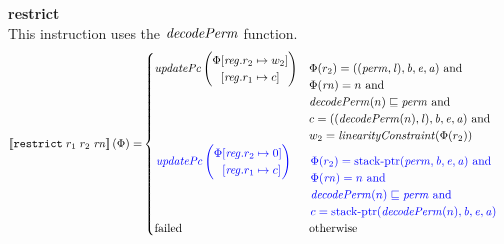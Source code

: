 \documentclass[a4paper]{article}
\begin{document}
\noindent\textbf{restrict}\\
This instruction uses the $\decPerm{}$ function.
\begin{align*}
  \sem{\trestrict{r_1}{r_2}{\rn}}(\Phi) = &
                                      \begin{cases}
                                        \updPcAddr{}\left(
                                          \arraycolsep=0pt
                                          \begin{array}{rl}
                                          \Phi&\updReg{r_2}{w_2}\\
                                              &\updReg{r_1}{c}
                                          \end{array} \right)
&
                                        \arraycolsep=0pt
                                        \begin{array}[t]{l}
                                          \Phi(r_2) = ((\perm,\lin),\baddr,\eaddr,\aaddr) \tand \\
                                          \Phi(\rn) = n \tand\\
                                          \decPerm{n} \sqsubseteq \perm \tand \\
                                          c = ((\decPerm{n},\lin),\baddr,\eaddr,\aaddr) \tand \\
                                          w_2 = \linCons{\Phi(r_2)}
                                        \end{array}
                                        \\
                                        \sourcecolor\left.
                                        \updPcAddr{}\left(
                                          \arraycolsep=0pt
                                          \begin{array}{rl}
                                          \Phi&\updReg{r_2}{0}\\
                                                    &\updReg{r_1}{c}
                                          \end{array}\right)\right.
                                        &
                                        \sourcecolor\left.
                                        \arraycolsep=0pt
                                        \begin{array}[t]{l}
                                          \Phi(r_2) = \stkptr{\perm,\baddr,\eaddr,\aaddr} \tand \\
                                          \Phi(\rn) = n \tand\\
                                          \decPerm{n} \sqsubseteq \perm \tand \\
                                          c = \stkptr{\decPerm{n},\baddr,\eaddr,\aaddr}
                                        \end{array}\right.
                                        \\
                                        \failed & \totherwise
                                      \end{cases}
\end{align*}
\end{document}
